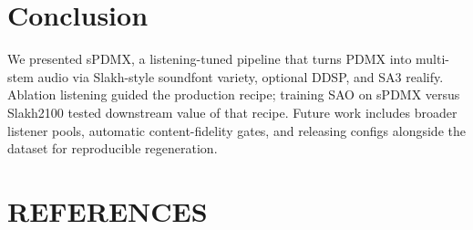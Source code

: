 \documentclass{article}
\begin{document}
\section{Conclusion}
\label{sec:conclusion}

We presented sPDMX, a listening-tuned pipeline that turns PDMX into multi-stem audio via Slakh-style soundfont variety, optional DDSP, and SA3 realify.
Ablation listening guided the production recipe; training SAO on sPDMX versus Slakh2100 tested downstream value of that recipe.
Future work includes broader listener pools, automatic content-fidelity gates, and releasing configs alongside the dataset for reproducible regeneration.


\vfill\pagebreak

\section{REFERENCES}
\label{sec:refs}


\end{document}
